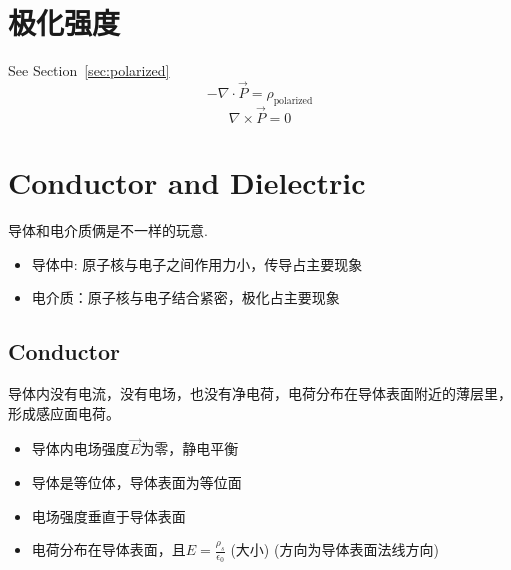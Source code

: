 \documentclass[a4paper]{report}
\begin{document}
\section{极化强度}
See Section~\ref{sec:polarized}
$$-\nabla\cdot \vec{P}=\rho_{\text{polarized}}$$
$$\nabla\times \vec{P}=0$$
\section{Conductor and Dielectric}
导体和电介质俩是不一样的玩意. 
\begin{itemize}
    \item 导体中: 原子核与电子之间作用力小，传导占主要现象
    \item 电介质：原子核与电子结合紧密，极化占主要现象
\end{itemize}

\subsection{Conductor}
导体内没有电流，没有电场，也没有净电荷，电荷分布在导体表面附近的薄层里，形成感应面电荷。
\begin{itemize}
    \item 导体内电场强度$\vec{E}$为零，静电平衡
    \item 导体是等位体，导体表面为等位面
    \item 电场强度垂直于导体表面
    \item 电荷分布在导体表面，且$E=\frac{\rho _s}{\epsilon _0}$ (大小) (方向为导体表面法线方向)
\end{itemize}
\end{document}
